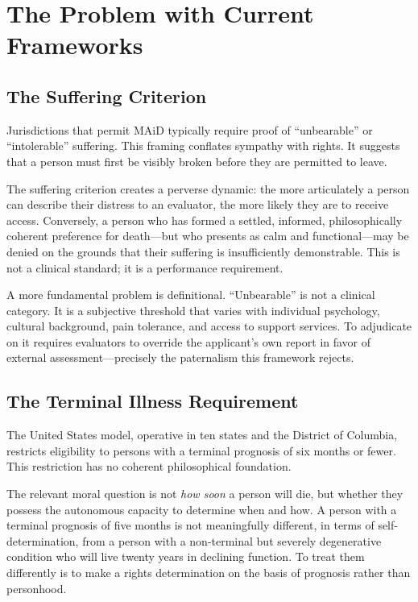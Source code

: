 \documentclass[11pt, letterpaper]{article}
\begin{document}
\newpage

\section{The Problem with Current Frameworks}

\subsection{The Suffering Criterion}

Jurisdictions that permit MAiD typically require proof of ``unbearable'' or ``intolerable''
suffering. This framing conflates sympathy with rights. It suggests that a person must first
be visibly broken before they are permitted to leave.

The suffering criterion creates a perverse dynamic: the more articulately a person can describe
their distress to an evaluator, the more likely they are to receive access. Conversely, a
person who has formed a settled, informed, philosophically coherent preference for death---but
who presents as calm and functional---may be denied on the grounds that their suffering is
insufficiently demonstrable. This is not a clinical standard; it is a performance requirement.

A more fundamental problem is definitional. ``Unbearable'' is not a clinical category. It is
a subjective threshold that varies with individual psychology, cultural background, pain
tolerance, and access to support services. To adjudicate on it requires evaluators to
override the applicant's own report in favor of external assessment---precisely the
paternalism this framework rejects.

\subsection{The Terminal Illness Requirement}

The United States model, operative in ten states and the District of Columbia, restricts
eligibility to persons with a terminal prognosis of six months or fewer. This restriction
has no coherent philosophical foundation.

The relevant moral question is not \emph{how soon} a person will die, but whether they possess
the autonomous capacity to determine when and how. A person with a terminal prognosis of
five months is not meaningfully different, in terms of self-determination, from a person with
a non-terminal but severely degenerative condition who will live twenty years in declining
function. To treat them differently is to make a rights determination on the basis of
prognosis rather than personhood.
\end{document}
